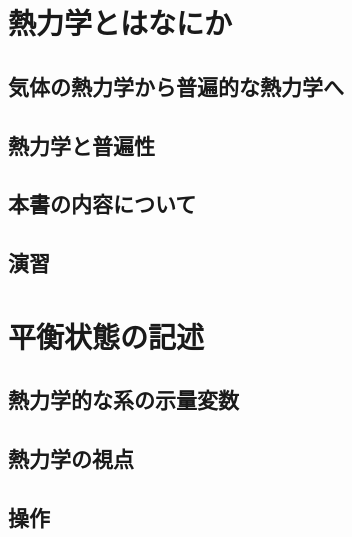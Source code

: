 \documentclass[dvipdfmx,oneside]{jsbook}
\begin{document}
\tableofcontents

\chapter{熱力学とはなにか}

\section{気体の熱力学から普遍的な熱力学へ}

\section{熱力学と普遍性}

\section{本書の内容について}


\section*{演習}


\chapter{平衡状態の記述}

\section{熱力学的な系の示量変数}


\section{熱力学の視点}


\section{操作}

\end{document}
